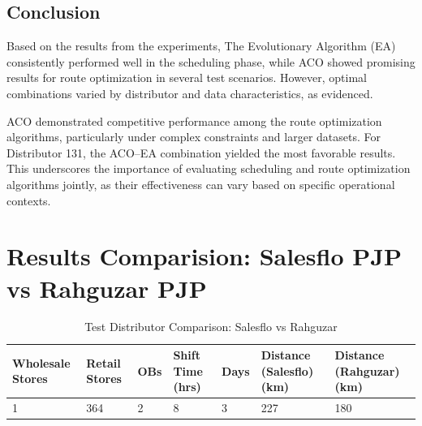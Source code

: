 \subsection{Conclusion}
Based on the results from the experiments, The Evolutionary Algorithm (EA) consistently performed well in the scheduling phase, while ACO showed promising results for route optimization in several test scenarios. However, optimal combinations varied by distributor and data characteristics, as evidenced.

ACO demonstrated competitive performance among the route optimization algorithms, particularly under complex constraints and larger datasets. For Distributor 131, the ACO–EA combination yielded the most favorable results. This underscores the importance of evaluating scheduling and route optimization algorithms jointly, as their effectiveness can vary based on specific operational contexts.


\section{Results Comparision: Salesflo PJP vs Rahguzar PJP}

\begin{table}[H]
    \centering
    \caption{Test Distributor Comparison: Salesflo vs Rahguzar}
    \begin{tabular}{|p{2.1cm}|p{1.8cm}|p{1.8cm}|p{1.8cm}|p{1.8cm}|p{2.5cm}|p{2.5cm}|}
    \hline
    \textbf{Wholesale Stores} & \textbf{Retail Stores} & \textbf{OBs} & \textbf{Shift Time (hrs)} & \textbf{Days} & \textbf{Distance (Salesflo) (km)} & \textbf{Distance (Rahguzar) (km)} \\
    \hline
    1 & 364 & 2 & 8 & 3 & 227 & 180 \\
    \hline
    \end{tabular}
    \label{tab:test_distributor_comparison}
    \end{table}
    